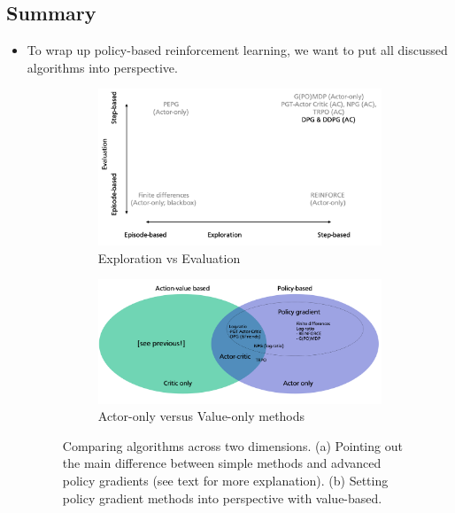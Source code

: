\subsection{Summary}
\begin{itemize}
	\item To wrap up policy-based reinforcement learning, we want to put all discussed algorithms into perspective.
	
	\begin{figure}[ht!]
		\centering
		\begin{subfigure}{0.45\textwidth}
			\centering
			\includegraphics[width=\textwidth]{figures/rl_policy_gradient_summary_1.png}
			\caption{Exploration vs Evaluation}
		\end{subfigure}
		\hspace{5mm}
		\begin{subfigure}{0.45\textwidth}
			\centering
			\includegraphics[width=\textwidth]{figures/rl_policy_gradient_summary_2.png}
			\caption{Actor-only versus Value-only methods}
		\end{subfigure}
		\caption{Comparing algorithms across two dimensions. (a) Pointing out the main difference between simple methods and advanced policy gradients (see text for more explanation). (b) Setting policy gradient methods into perspective with value-based.}
	\end{figure}


\end{itemize}
